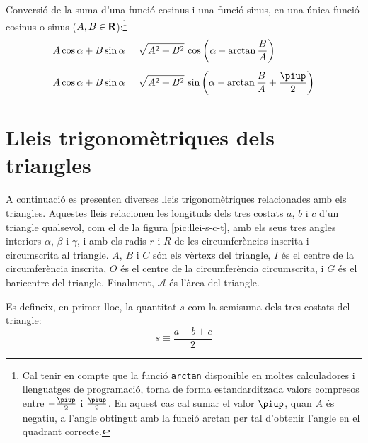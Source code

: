 Conversió de la suma d'una funció cosinus i una funció sinus, en una única
funció cosinus o sinus ($A,B\in{\ensuremath{\boldsymbol{\mathsf{R}}}}$):\footnote{Cal tenir en compte que la funció \texttt{arctan} disponible en moltes calculadores i llenguatges de programació, torna de forma estandarditzada valors compresos entre $-\frac{\piup}{2}$ i $\frac{\piup}{2}$. En aquest cas cal sumar el valor $\piup$, quan $A$ és negatiu, a l'angle obtingut amb la funció \textsf{arctan} per tal d'obtenir l'angle en el quadrant correcte.}
\begin{subequations}
\begin{align}
    A \cos \alpha + B \sin \alpha &= \sqrt{A^2+B^2}\, \cos \left(\alpha - \arctan\dfrac{B}{A}\right)\label{eq:AcosBsin}\\[1ex]
    A \cos \alpha + B \sin \alpha &= \sqrt{A^2+B^2}\, \sin \left(\alpha - \arctan\dfrac{B}{A}+\dfrac{\piup}{2}\right)\label{eq:AcosBsinS}
\end{align}
\end{subequations}

\break

\section{Lleis trigonomètriques dels triangles}\label{sec:lleis-trig-triang}

A continuació es presenten diverses lleis trigonomètriques relacionades amb els triangles. Aquestes lleis relacionen les longituds dels tres costats $a$, $b$ i $c$ d'un triangle qualsevol, com el de
la figura \vref{pic:llei-s-c-t}, amb els seus tres angles interiors
$\alpha$, $\beta$ i $\gamma$, i amb els radis $r$ i $R$ de les circumferències inscrita i circumscrita al triangle. $A$, $B$ i $C$ són els vèrtexs del triangle, $I$ és el centre de la circumferència inscrita, $O$   és el centre de la circumferència circumscrita, i $G$ és el baricentre del triangle. Finalment, $\mathscr{A}$ és l'àrea del triangle.

\begin{center}
    
     \label{pic:llei-s-c-t}
\end{center}

Es defineix, en primer lloc, la quantitat $s$ com la semisuma dels tres costats del triangle:
\begin{equation}
	s \equiv \frac{a+b+c}{2}
\end{equation}

